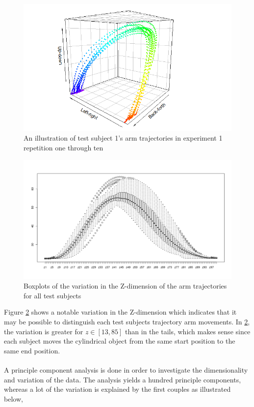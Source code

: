 \documentclass[11pt, fleqn, titlepage]{article}
\begin{document}
\begin{figure}[H]
	\centering
	\includegraphics[scale=0.6]{billeder/Rplot.png}
	\caption{An illustration of test subject 1's arm trajectories in experiment 1 repetition one through ten}
	\label{fig:rplot}
\end{figure}


\begin{figure}[H]
	\centering
	\includegraphics[width=0.7\linewidth]{billeder/boxplot_z.pdf}
	\caption{Boxplots of the variation in the Z-dimension of the arm trajectories for all test subjects}
	\label{fig:boxplotz}
\end{figure}

Figure \ref{fig:boxplotz} shows a notable variation in the Z-dimension which indicates that it may be possible to distinguish each test subjects trajectory arm movements. In \ref{fig:boxplotz}, the variation is greater for $ z \in [13,85] $ than in the tails, which makes sense since each subject moves the cylindrical object from the same start position to the same end position.
\\\\
A principle component analysis is done in order to investigate the dimensionality and variation of the data. The analysis yields a hundred principle components, whereas a lot of the variation is explained by the first couples as illustrated below, 
\end{document}
